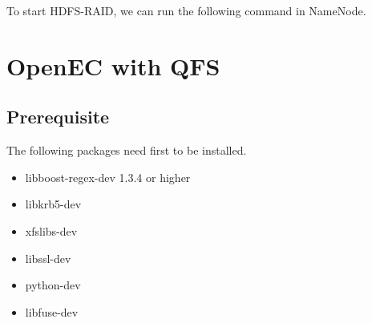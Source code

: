 \documentclass[letterpaper,12pt]{article}
\begin{document}
To start HDFS-RAID, we can run the following command in NameNode.

\begin{center}
\noindent{}
\end{center}

\section{OpenEC with QFS}
\label{sec:qfs}

\subsection{Prerequisite}

The following packages need first to be installed.

\begin{itemize}

\item libboost-regex-dev 1.3.4 or higher

\begin{center}
\noindent{}
\end{center}

\item libkrb5-dev

\begin{center}
\noindent{}
\end{center}

\item xfslibs-dev

\begin{center}
\noindent{}
\end{center}

\item libssl-dev

\begin{center}
\noindent{}
\end{center}

\item python-dev

\begin{center}
\noindent{}
\end{center}

\item libfuse-dev

\begin{center}
\noindent{}
\end{center}

\end{itemize}
\end{document}
